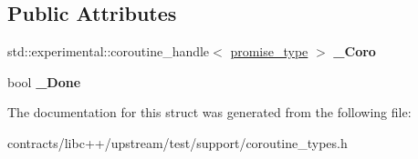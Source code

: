 \subsection*{Public Attributes}
\begin{DoxyCompactItemize}
\item 
\mbox{\label{structgenerator_1_1iterator_a8f89d18a800839a35729060793bd0385}} 
std\+::experimental\+::coroutine\+\_\+handle$<$ \mbox{\hyperlink{structgenerator_1_1promise__type}{promise\+\_\+type}} $>$ {\bfseries \+\_\+\+Coro}
\item 
\mbox{\label{structgenerator_1_1iterator_a2f0d1f03ab2609166d089b6901683cc1}} 
bool {\bfseries \+\_\+\+Done}
\end{DoxyCompactItemize}


The documentation for this struct was generated from the following file\+:\begin{DoxyCompactItemize}
\item 
contracts/libc++/upstream/test/support/coroutine\+\_\+types.\+h\end{DoxyCompactItemize}
